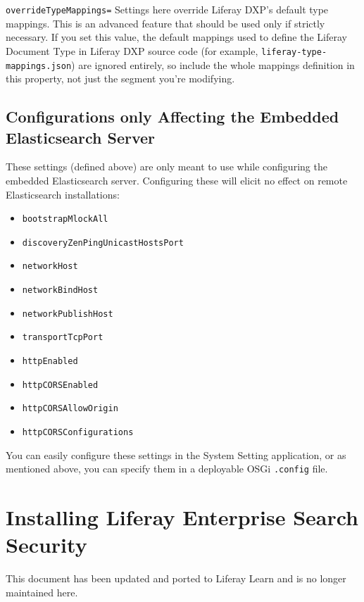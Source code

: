 \texttt{overrideTypeMappings=} Settings here override Liferay DXP's
default type mappings. This is an advanced feature that should be used
only if strictly necessary. If you set this value, the default mappings
used to define the Liferay Document Type in Liferay DXP source code (for
example, \texttt{liferay-type-mappings.json}) are ignored entirely, so
include the whole mappings definition in this property, not just the
segment you're modifying.

\section{Configurations only Affecting the Embedded Elasticsearch
Server}\label{configurations-only-affecting-the-embedded-elasticsearch-server}

These settings (defined above) are only meant to use while configuring
the embedded Elasticsearch server. Configuring these will elicit no
effect on remote Elasticsearch installations:

\begin{itemize}
\tightlist
\item
  \texttt{bootstrapMlockAll}
\item
  \texttt{discoveryZenPingUnicastHostsPort}
\item
  \texttt{networkHost}
\item
  \texttt{networkBindHost}
\item
  \texttt{networkPublishHost}
\item
  \texttt{transportTcpPort}
\item
  \texttt{httpEnabled}
\item
  \texttt{httpCORSEnabled}
\item
  \texttt{httpCORSAllowOrigin}
\item
  \texttt{httpCORSConfigurations}
\end{itemize}

You can easily configure these settings in the System Setting
application, or as mentioned above, you can specify them in a deployable
OSGi \texttt{.config} file.

\chapter{Installing Liferay Enterprise Search
Security}\label{installing-liferay-enterprise-search-security}

{This document has been updated and ported to Liferay Learn and is no
longer maintained here.}

